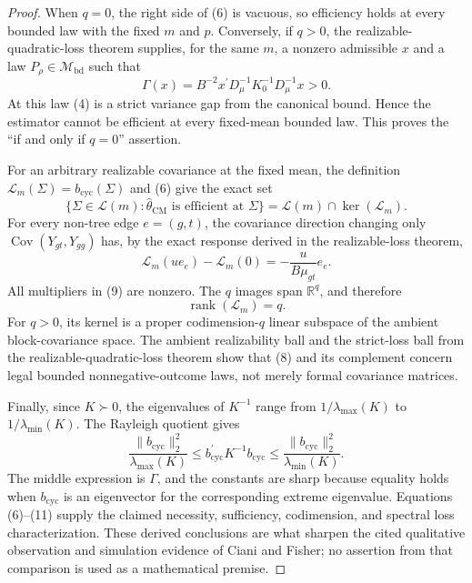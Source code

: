 \documentclass{article}
\begin{document}
\begin{proof}
When \(q=0\), the right side of (6) is vacuous, so efficiency holds at every bounded law with the fixed \(m\) and \(p\).  Conversely, if \(q>0\), the realizable-quadratic-loss theorem supplies, for the same \(m\), a nonzero admissible \(x\) and a law \(P_\rho\in\mathcal M_{\mathrm{bd}}\) such that
\[
\Gamma(x)
=B^{-2}x^{\prime}D_\mu^{-1}K_0^{-1}D_\mu^{-1}x>0.                    \tag{7}
\]
At this law (4) is a strict variance gap from the canonical bound.  Hence the estimator cannot be efficient at every fixed-mean bounded law.  This proves the ``if and only if \(q=0\)'' assertion.

For an arbitrary realizable covariance at the fixed mean, the definition
\(\mathcal L_m(\Sigma)=b_{\mathrm{cyc}}(\Sigma)\) and (6) give the exact set
\[
\{\Sigma\in\mathcal L(m):
  \widehat\theta_{\mathrm{CM}}\text{ is efficient at }\Sigma\}
=\mathcal L(m)\cap\ker(\mathcal L_m).                                  \tag{8}
\]
For every non-tree edge \(e=(g,t)\), the covariance direction changing only
\(\operatorname{Cov}(Y_{gt},Y_{gg})\) has, by the exact response derived in the realizable-loss theorem,
\[
\mathcal L_m(ue_e)-\mathcal L_m(0)
=-\frac{u}{B\mu_{gt}}e_e.                                               \tag{9}
\]
All multipliers in (9) are nonzero.  The \(q\) images span \(\mathbb R^q\), and therefore
\[
\operatorname{rank}(\mathcal L_m)=q.                                   \tag{10}
\]
For \(q>0\), its kernel is a proper codimension-\(q\) linear subspace of the ambient block-covariance space.  The ambient realizability ball and the strict-loss ball from the realizable-quadratic-loss theorem show that (8) and its complement concern legal bounded nonnegative-outcome laws, not merely formal covariance matrices.

Finally, since \(K\succ0\), the eigenvalues of \(K^{-1}\) range from
\(1/\lambda_{\max}(K)\) to \(1/\lambda_{\min}(K)\).  The Rayleigh quotient gives
\[
\frac{\|b_{\mathrm{cyc}}\|_2^2}{\lambda_{\max}(K)}
\le b_{\mathrm{cyc}}^{\prime}K^{-1}b_{\mathrm{cyc}}
\le\frac{\|b_{\mathrm{cyc}}\|_2^2}{\lambda_{\min}(K)}.              \tag{11}
\]
The middle expression is \(\Gamma\), and the constants are sharp because equality holds when \(b_{\mathrm{cyc}}\) is an eigenvector for the corresponding extreme eigenvalue.  Equations (6)--(11) supply the claimed necessity, sufficiency, codimension, and spectral loss characterization.  These derived conclusions are what sharpen the cited qualitative observation and simulation evidence of Ciani and Fisher; no assertion from that comparison is used as a mathematical premise.
\end{proof}
\end{document}
